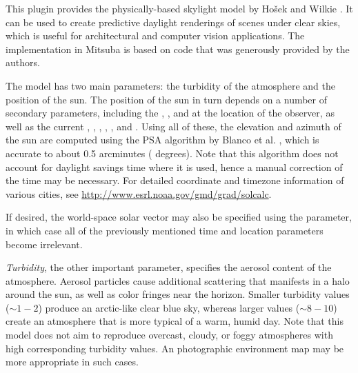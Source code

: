 This plugin provides the physically-based skylight model by
Ho\v{s}ek and Wilkie \cite{Hosek2012Analytic}. It can be used to
create predictive daylight renderings of scenes under clear skies,
which is useful for architectural and computer vision applications.
The implementation in Mitsuba is based on code that was
generously provided by the authors.

The model has two main parameters: the turbidity of the atmosphere
and the position of the sun.
The position of the sun in turn depends on a number of secondary
parameters, including the , ,
and  at the location of the observer, as well as the
current , , , ,
, and .
Using all of these, the elevation and azimuth of the sun are computed
using the PSA algorithm by Blanco et al. \cite{Blanco2001Computing},
which is accurate to about 0.5 arcminutes ( degrees).
Note that this algorithm does not account for daylight
savings time where it is used, hence a manual correction of the
time may be necessary.
For detailed coordinate and timezone information of various cities, see
\url{http://www.esrl.noaa.gov/gmd/grad/solcalc}.

If desired, the world-space solar vector may also be specified
using the  parameter, in which case all of the
previously mentioned time and location parameters become irrelevant.


\emph{Turbidity}, the other important parameter, specifies the aerosol
content of the atmosphere. Aerosol particles cause additional scattering that
manifests in a halo around the sun, as well as color fringes near the
horizon.
Smaller turbidity values ($\sim 1-2$) produce an
arctic-like clear blue sky, whereas larger values ($\sim 8-10$)
create an atmosphere that is more typical of a warm, humid day.
Note that this model does not aim to reproduce overcast, cloudy, or foggy
atmospheres with high corresponding turbidity values. An photographic
environment map may be more appropriate in such cases.

